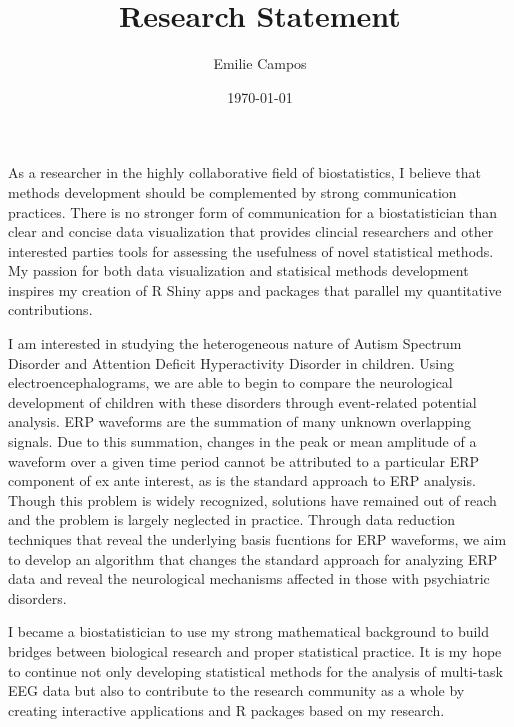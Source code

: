 \documentclass[12pt]{article}
\title{Research Statement}
\author{Emilie Campos}
\date{\today}
\begin{document}
\maketitle
As a researcher in the highly collaborative field of biostatistics, I believe that methods development should be complemented by strong communication practices. There is no stronger form of communication for a biostatistician than clear and concise data visualization that provides clincial researchers and other interested parties tools for assessing the usefulness of novel statistical methods. My passion for both data visualization and statisical methods development inspires my creation of R Shiny apps and packages that parallel my quantitative contributions. 

I am interested in studying the heterogeneous nature of Autism Spectrum Disorder and Attention Deficit Hyperactivity Disorder in children. Using electroencephalograms, we are able to begin to compare the neurological development of children with these disorders through event-related potential analysis. ERP waveforms are the summation of many unknown overlapping signals. Due to this summation, changes in the peak or mean amplitude of a waveform over a given time period cannot be attributed to a particular ERP component of ex ante interest, as is the standard approach to ERP analysis. Though this problem is widely recognized, solutions have remained out of reach and the problem is largely neglected in practice. Through data reduction techniques that reveal the underlying basis fucntions for ERP waveforms, we aim to develop an algorithm that changes the standard approach for analyzing ERP data and reveal the neurological mechanisms affected in those with psychiatric disorders.

I became a biostatistician to use my strong mathematical background to build bridges between biological research and proper statistical practice. It is my hope to continue not only developing statistical methods for the analysis of multi-task EEG data but also to contribute to the research community as a whole by creating interactive applications and R packages based on my research.
\end{document}
